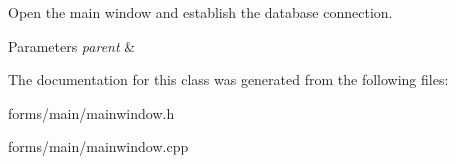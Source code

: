 \-Open the main window and establish the database connection. 


\begin{DoxyParams}{\-Parameters}
{\em parent} & \\
\hline
\end{DoxyParams}


\-The documentation for this class was generated from the following files\-:\begin{DoxyCompactItemize}
\item 
forms/main/mainwindow.\-h\item 
forms/main/mainwindow.\-cpp\end{DoxyCompactItemize}
